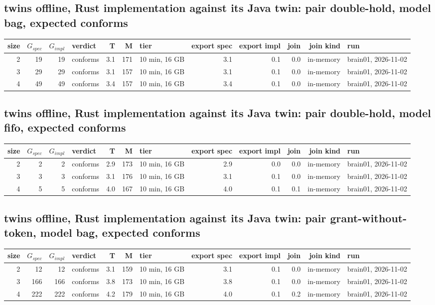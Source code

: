 \documentclass[10pt]{article}
\begin{document}
\subsection*{twins offline, Rust implementation against its Java twin: pair \textsf{double-hold}, model bag, expected conforms}
\begin{longtable}{@{}rrrlrrlrrrrl@{}}
\toprule
size & $G_{\mathit{spec}}$ & $G_{\mathit{impl}}$ & verdict & T & M & tier & export spec & export impl & join & join kind & run \\
\midrule
\endhead
\color{red} 2 & 19 & 19 & conforms & 3.1 & 171 & 10 min, 16 GB & 3.1 & 0.1 & 0.0 & in-memory & brain01, 2026-11-02 \\
\color{red} 3 & 29 & 29 & conforms & 3.1 & 157 & 10 min, 16 GB & 3.1 & 0.1 & 0.0 & in-memory & brain01, 2026-11-02 \\
\color{red} 4 & 49 & 49 & conforms & 3.4 & 157 & 10 min, 16 GB & 3.4 & 0.1 & 0.0 & in-memory & brain01, 2026-11-02 \\
\bottomrule
\end{longtable}
\subsection*{twins offline, Rust implementation against its Java twin: pair \textsf{double-hold}, model fifo, expected conforms}
\begin{longtable}{@{}rrrlrrlrrrrl@{}}
\toprule
size & $G_{\mathit{spec}}$ & $G_{\mathit{impl}}$ & verdict & T & M & tier & export spec & export impl & join & join kind & run \\
\midrule
\endhead
\color{red} 2 & 2 & 2 & conforms & 2.9 & 173 & 10 min, 16 GB & 2.9 & 0.0 & 0.0 & in-memory & brain01, 2026-11-02 \\
\color{red} 3 & 3 & 3 & conforms & 3.1 & 176 & 10 min, 16 GB & 3.1 & 0.1 & 0.0 & in-memory & brain01, 2026-11-02 \\
\color{red} 4 & 5 & 5 & conforms & 4.0 & 167 & 10 min, 16 GB & 4.0 & 0.1 & 0.1 & in-memory & brain01, 2026-11-02 \\
\bottomrule
\end{longtable}
\subsection*{twins offline, Rust implementation against its Java twin: pair \textsf{grant-without-token}, model bag, expected conforms}
\begin{longtable}{@{}rrrlrrlrrrrl@{}}
\toprule
size & $G_{\mathit{spec}}$ & $G_{\mathit{impl}}$ & verdict & T & M & tier & export spec & export impl & join & join kind & run \\
\midrule
\endhead
\color{red} 2 & 12 & 12 & conforms & 3.1 & 159 & 10 min, 16 GB & 3.1 & 0.1 & 0.0 & in-memory & brain01, 2026-11-02 \\
\color{red} 3 & 166 & 166 & conforms & 3.8 & 173 & 10 min, 16 GB & 3.8 & 0.1 & 0.0 & in-memory & brain01, 2026-11-02 \\
\color{red} 4 & 222 & 222 & conforms & 4.2 & 179 & 10 min, 16 GB & 4.0 & 0.1 & 0.2 & in-memory & brain01, 2026-11-02 \\
\bottomrule
\end{longtable}
\end{document}

